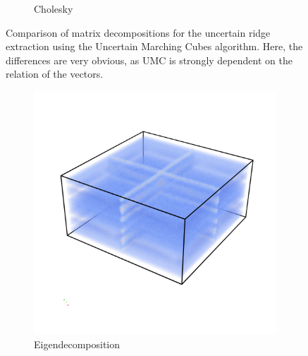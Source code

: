 \begin{figure}[]
\begin{subfigure}[b]{0.49\textwidth}
        \caption{Cholesky}
        \label{fig:MCchol}
    \end{subfigure}
    \caption{Comparison of matrix decompositions for the uncertain
    ridge extraction using the Uncertain Marching Cubes algorithm. Here, the
    differences are very obvious, as UMC is strongly dependent on the relation
    of the vectors.}
    \label{fig:MCcomp}
\end{figure}
\begin{figure}
    \begin{subfigure}[b]{0.49\textwidth}
        \includegraphics[trim=0 350 0 300, clip=true, width=\textwidth]{Images/highuncEigen.png}
        \caption{Eigendecomposition}
        \label{fig:HUCeigen}
    \end{subfigure}
    \begin{subfigure}[b]{0.49\textwidth}

\end{subfigure}
\end{figure}
